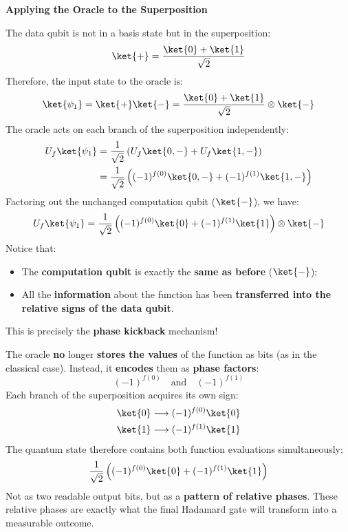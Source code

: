 \highspace
\begin{flushleft}
    \textcolor{Green3}{ \textbf{Applying the Oracle to the Superposition}}
\end{flushleft}
The data qubit is not in a basis state but in the superposition:
\begin{equation*}
    \ket{+} = \frac{\ket{0} + \ket{1}}{\sqrt{2}}
\end{equation*}
Therefore, the input state to the oracle is:
\begin{equation*}
    \ket{\psi_1} = \ket{+}\ket{-} = \frac{\ket{0} + \ket{1}}{\sqrt{2}} \otimes \ket{-}
\end{equation*}
The oracle acts on each branch of the superposition independently:
\begin{align*}
    U_f \ket{\psi_1} &= \frac{1}{\sqrt{2}} \left( U_f \ket{0, -} + U_f \ket{1, -} \right) \\
    &= \frac{1}{\sqrt{2}} \left( (-1)^{f(0)} \ket{0, -} + (-1)^{f(1)} \ket{1, -} \right)
\end{align*}
Factoring out the unchanged computation qubit ($\ket{-}$), we have:
\begin{equation}
    U_f \ket{\psi_1} = \frac{1}{\sqrt{2}} \left( (-1)^{f(0)} \ket{0} + (-1)^{f(1)} \ket{1} \right) \otimes \ket{-}
\end{equation}
Notice that:
\begin{itemize}
    \item The \textbf{computation qubit} is exactly the \textbf{same as before} ($\ket{-}$);
    \item All the \textbf{information} about the function has been \textbf{transferred into the relative signs of the data qubit}.
\end{itemize}
This is precisely the \textbf{phase kickback} mechanism!

\highspace
The oracle \textbf{no} longer \textbf{stores the values} of the function as bits (as in the classical case). Instead, it \textbf{encodes} them as \textbf{phase factors}:
\begin{equation*}
    \left(-1\right)^{f(0)} \quad \text{and} \quad \left(-1\right)^{f(1)}
\end{equation*}
Each branch of the superposition acquires its own sign:
\begin{equation*}
    \begin{aligned}
        \ket{0} &\longrightarrow (-1)^{f(0)} \ket{0} \\
        \ket{1} &\longrightarrow (-1)^{f(1)} \ket{1}
    \end{aligned}
\end{equation*}
The quantum state therefore contains both function evaluations simultaneously:
\begin{equation*}
    \frac{1}{\sqrt{2}} \left( (-1)^{f(0)} \ket{0} + (-1)^{f(1)} \ket{1} \right)
\end{equation*}
Not as two readable output bits, but as a \textbf{pattern of relative phases}. These relative phases are exactly what the final Hadamard gate will transform into a measurable outcome.

